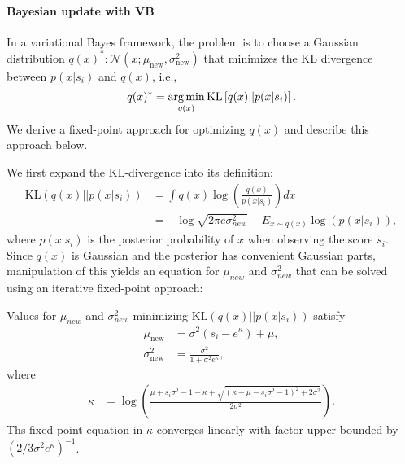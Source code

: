 \paragraph{\bf Bayesian update with VB}
In a variational Bayes framework, the problem is to choose a Gaussian distribution $q(x)^*:
\mathcal{N}(x;\mu_{\text{new}}, \sigma_{\text{new}}^2)$ that minimizes
the KL divergence between $p(x|s_i)$ and $q(x)$, i.e.,
\begin{align}\label{eq:marginal2}
    q(x)^* = \argmin_{q(x)} \text{KL}\left[q(x)|| p(x|s_i)\right].
\end{align}
We derive a fixed-point approach for optimizing $q(x)$ \cite{Beal:EMFixedPoint02} and describe this approach below.

We first expand the KL-divergence into its definition:
\begin{align}\label{eq:KL}
    \text{KL}\left(q(x)|| p(x|s_i)\right) &= \int q(x) \log \left( \frac{q(x)}{p(x|s_i)} \right) dx \nonumber \\
     \qquad &= -\log\sqrt{2\pi e \sigma_{new}^2} - E_{x\sim q(x)} \log \left( p(x|s_i) \right),
\end{align}
\unindentmore where $p(x|s_i)$ is the posterior probability of $x$ when
observing the score $s_i$. Since $q(x)$ is Gaussian
and the posterior has convenient Gaussian parts, manipulation of this
yields an equation for $\mu_{new}$ and $\sigma_{new}^2$ that can be
solved using an iterative fixed-point approach:
\begin{lemma}
Values for $\mu_{new}$ and $\sigma_{new}^2$
minimizing $\text{KL}\left(q(x)|| p(x|s_i)\right)$
satisfy
\begin{align}\label{eq:ExactMuSigmaNew}
    \mu_{\text{new}} & = \sigma^{2}\left(s_i - e^\kappa\right) + \mu, \nonumber \\
   \sigma_{\text{new}}^2 & = \frac{\sigma^2}{1+\sigma^2 e^\kappa },
\end{align}
where
\begin{align}\label{eq:approximationZQuad5}
     \kappa  &= \log\left(\frac{\mu + s_i\sigma^2-1-\kappa+\sqrt{(\kappa - \mu - s_i\sigma^2 -1)^2+2\sigma^2}}{2\sigma^2}\right).
\end{align}
Ths fixed point equation in $\kappa$ converges linearly
with factor upper bounded by 
$\left( 2/3 \sigma^2 e^\kappa \right)^{-1}$.
\end{lemma}
